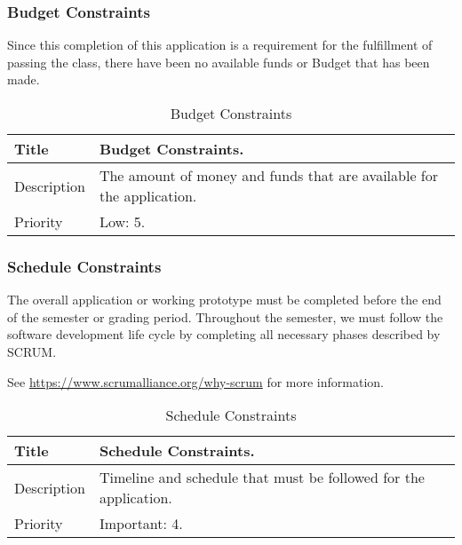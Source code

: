 \subsubsection{Budget Constraints}
  \label{system-constraints/budget-and-schedule/budget-title}
  Since this completion of this application is a requirement for the
  fulfillment of passing the class, there have been no available funds or
  Budget that has been made.

  \begin{table}[h!]
    \caption{Budget Constraints}
    \label{system-constraints/budget-and-schedule/budget-table}
    \begin{tabularx}{\textwidth}{|l|X|}
      \hline
      Title       & Budget Constraints. \\ \hline
      Description & The amount of money and funds that are available for
                    the application. \\ \hline
      Priority    & Low: 5. \\ \hline
    \end{tabularx}
  \end{table}

\subsubsection{Schedule Constraints}
  The overall application or working prototype must be completed before the
  end of the semester or grading period. Throughout the semester, we must
  follow the software development life cycle by completing all necessary phases
  described by SCRUM.

  See \url{https://www.scrumalliance.org/why-scrum} for more information.

  \begin{table}[h!]
    \caption{Schedule Constraints}
    \label{system-constraints/budget-and-schedule/schedule-table}
    \begin{tabularx}{\textwidth}{|l|X|}
      \hline
      Title       & Schedule Constraints. \\ \hline
      Description &   Timeline and schedule that must be followed for the application.
                    \\ \hline
      Priority    & Important: 4. \\ \hline
    \end{tabularx}
  \end{table}
